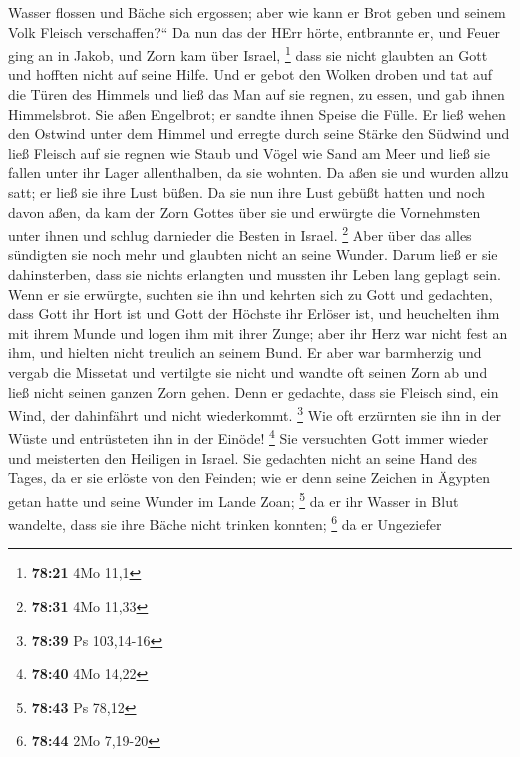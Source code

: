 Wasser flossen und Bäche sich ergossen; aber wie kann er Brot geben und
seinem Volk Fleisch verschaffen?{}``  Da nun das der HErr
hörte, entbrannte er, und Feuer ging an in Jakob, und Zorn kam über
Israel, \footnote{\textbf{78:21} 4Mo 11,1}  dass sie
nicht glaubten an Gott und hofften nicht auf seine Hilfe.
 Und er gebot den Wolken droben und tat auf die Türen des
Himmels  und ließ das Man auf sie regnen, zu essen, und
gab ihnen Himmelsbrot.  Sie aßen Engelbrot; er sandte
ihnen Speise die Fülle.  Er ließ wehen den Ostwind unter
dem Himmel und erregte durch seine Stärke den Südwind 
und ließ Fleisch auf sie regnen wie Staub und Vögel wie Sand am Meer
 und ließ sie fallen unter ihr Lager allenthalben, da sie
wohnten.  Da aßen sie und wurden allzu satt; er ließ sie
ihre Lust büßen.  Da sie nun ihre Lust gebüßt hatten und
noch davon aßen,  da kam der Zorn Gottes über sie und
erwürgte die Vornehmsten unter ihnen und schlug darnieder die Besten in
Israel. \footnote{\textbf{78:31} 4Mo 11,33}  Aber über
das alles sündigten sie noch mehr und glaubten nicht an seine Wunder.
 Darum ließ er sie dahinsterben, dass sie nichts
erlangten und mussten ihr Leben lang geplagt sein.  Wenn
er sie erwürgte, suchten sie ihn und kehrten sich zu Gott
 und gedachten, dass Gott ihr Hort ist und Gott der
Höchste ihr Erlöser ist,  und heuchelten ihm mit ihrem
Munde und logen ihm mit ihrer Zunge;  aber ihr Herz war
nicht fest an ihm, und hielten nicht treulich an seinem Bund.
 Er aber war barmherzig und vergab die Missetat und
vertilgte sie nicht und wandte oft seinen Zorn ab und ließ nicht seinen
ganzen Zorn gehen.  Denn er gedachte, dass sie Fleisch
sind, ein Wind, der dahinfährt und nicht wiederkommt. \footnote{\textbf{78:39}
  Ps 103,14-16}  Wie oft erzürnten sie ihn in der Wüste
und entrüsteten ihn in der Einöde! \footnote{\textbf{78:40} 4Mo 14,22}
 Sie versuchten Gott immer wieder und meisterten den
Heiligen in Israel.  Sie gedachten nicht an seine Hand
des Tages, da er sie erlöste von den Feinden;  wie er
denn seine Zeichen in Ägypten getan hatte und seine Wunder im Lande
Zoan; \footnote{\textbf{78:43} Ps 78,12}  da er ihr
Wasser in Blut wandelte, dass sie ihre Bäche nicht trinken konnten;
\footnote{\textbf{78:44} 2Mo 7,19-20}  da er Ungeziefer
